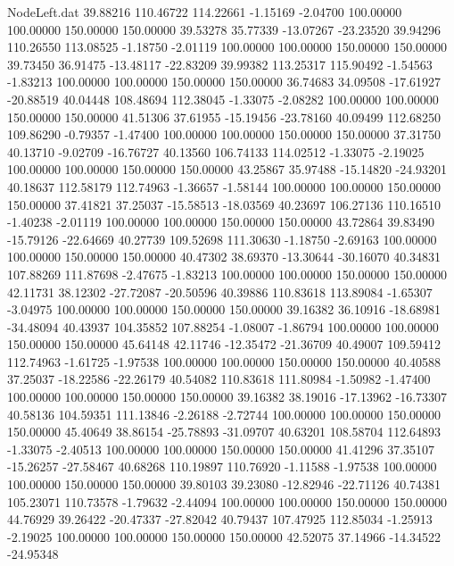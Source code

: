 \begin{filecontents}{NodeLeft.dat}
  39.88216  110.46722  114.22661    -1.15169   -2.04700  100.00000  100.00000  150.00000  150.00000   39.53278   35.77339  -13.07267  -23.23520
  39.94296  110.26550  113.08525    -1.18750   -2.01119  100.00000  100.00000  150.00000  150.00000   39.73450   36.91475  -13.48117  -22.83209
  39.99382  113.25317  115.90492    -1.54563   -1.83213  100.00000  100.00000  150.00000  150.00000   36.74683   34.09508  -17.61927  -20.88519
  40.04448  108.48694  112.38045    -1.33075   -2.08282  100.00000  100.00000  150.00000  150.00000   41.51306   37.61955  -15.19456  -23.78160
  40.09499  112.68250  109.86290    -0.79357   -1.47400  100.00000  100.00000  150.00000  150.00000   37.31750   40.13710   -9.02709  -16.76727
  40.13560  106.74133  114.02512    -1.33075   -2.19025  100.00000  100.00000  150.00000  150.00000   43.25867   35.97488  -15.14820  -24.93201
  40.18637  112.58179  112.74963    -1.36657   -1.58144  100.00000  100.00000  150.00000  150.00000   37.41821   37.25037  -15.58513  -18.03569
  40.23697  106.27136  110.16510    -1.40238   -2.01119  100.00000  100.00000  150.00000  150.00000   43.72864   39.83490  -15.79126  -22.64669
  40.27739  109.52698  111.30630    -1.18750   -2.69163  100.00000  100.00000  150.00000  150.00000   40.47302   38.69370  -13.30644  -30.16070
  40.34831  107.88269  111.87698    -2.47675   -1.83213  100.00000  100.00000  150.00000  150.00000   42.11731   38.12302  -27.72087  -20.50596
  40.39886  110.83618  113.89084    -1.65307   -3.04975  100.00000  100.00000  150.00000  150.00000   39.16382   36.10916  -18.68981  -34.48094
  40.43937  104.35852  107.88254    -1.08007   -1.86794  100.00000  100.00000  150.00000  150.00000   45.64148   42.11746  -12.35472  -21.36709
  40.49007  109.59412  112.74963    -1.61725   -1.97538  100.00000  100.00000  150.00000  150.00000   40.40588   37.25037  -18.22586  -22.26179
  40.54082  110.83618  111.80984    -1.50982   -1.47400  100.00000  100.00000  150.00000  150.00000   39.16382   38.19016  -17.13962  -16.73307
  40.58136  104.59351  111.13846    -2.26188   -2.72744  100.00000  100.00000  150.00000  150.00000   45.40649   38.86154  -25.78893  -31.09707
  40.63201  108.58704  112.64893    -1.33075   -2.40513  100.00000  100.00000  150.00000  150.00000   41.41296   37.35107  -15.26257  -27.58467
  40.68268  110.19897  110.76920    -1.11588   -1.97538  100.00000  100.00000  150.00000  150.00000   39.80103   39.23080  -12.82946  -22.71126
  40.74381  105.23071  110.73578    -1.79632   -2.44094  100.00000  100.00000  150.00000  150.00000   44.76929   39.26422  -20.47337  -27.82042
  40.79437  107.47925  112.85034    -1.25913   -2.19025  100.00000  100.00000  150.00000  150.00000   42.52075   37.14966  -14.34522  -24.95348

\end{filecontents}
